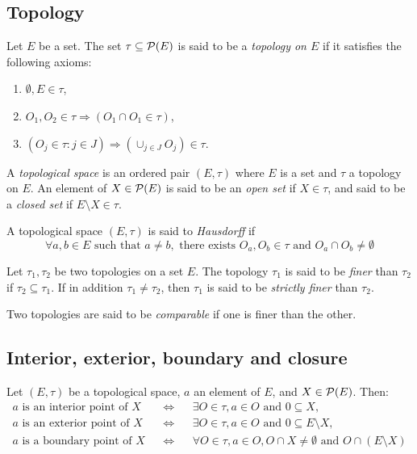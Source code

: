 \subsection{Topology}

\begin{definition}
    Let $E$ be a set. The set $\tau \subseteq \mathcal{P}(E)$ is said to be a \emph{topology on $E$} if it satisfies the following axioms:
    \begin{enumerate}
        \item $\emptyset, E \in \tau$,
        \item $O_1, O_2 \in \tau \Rightarrow (O_1 \cap O_1 \in \tau)$,
        \item $(O_j \in \tau : j \in J) \Rightarrow (\cup_{j \in J} O_j) \in \tau$.
    \end{enumerate} 
    A \emph{topological space} is an ordered pair $(E, \tau)$ where $E$ is a set and $\tau$ a topology on $E$.
    An element of $X \in \mathcal{P}(E)$ is said to be an \emph{open set} if $X \in \tau$, and said to be a \emph{closed set} if $E \setminus X \in \tau$.
\end{definition}

\begin{definition}
    A topological space $(E, \tau)$ is said to \emph{Hausdorff} if
    \begin{equation*}
        \forall a,b \in E \text{ such that } a \neq b, \text{ there exists } O_a, O_b \in \tau \text{ and } O_a \cap O_b \neq \emptyset
    \end{equation*}
\end{definition}

\begin{definition}
    Let $\tau_1, \tau_2$ be two topologies on a set $E$. The topology $\tau_1$ is said to be \emph{finer} than $\tau_2$ if $\tau_2 \subseteq \tau_1$.
    If in addition $\tau_1 \neq \tau_2$, then $\tau_1$ is said to be \emph{strictly finer} than $\tau_2$. 
\end{definition}

Two topologies are said to be \emph{comparable} if one is finer than the other.

\subsection{Interior, exterior, boundary and closure}

\begin{definition}
    Let $(E, \tau)$ be a topological space, $a$ an element of $E$, and $X \in \mathcal{P}(E)$. Then:
    \begin{align*}
        a \text{ is an interior point of } X && \Leftrightarrow && \exists O \in \tau, a \in O \text{ and } 0 \subseteq X, \\
        a \text{ is an exterior point of } X && \Leftrightarrow && \exists O \in \tau, a \in O \text{ and } 0 \subseteq E \setminus X, \\
        a \text{ is a boundary point of } X && \Leftrightarrow && \forall O \in \tau, a \in O , O \cap X \neq \emptyset \text{ and } O \cap (E \setminus X) \\
    \end{align*}
\end{definition}

